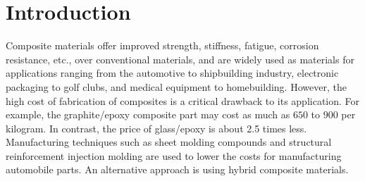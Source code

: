\section{Introduction}
Composite materials offer improved strength, stiffness, fatigue, corrosion resistance, etc., over
conventional materials, and are widely used as materials for applications ranging from the automotive to shipbuilding
industry, electronic packaging to golf clubs, and medical equipment to homebuilding. However, the high
cost of fabrication of composites is a critical drawback to its application. For example, the
graphite/epoxy composite part may cost as much as $650$ to $900$ per kilogram. In contrast, the price
of glass/epoxy is about 2.5 times less. Manufacturing techniques such as sheet molding compounds and
structural reinforcement injection molding are used to lower the costs for manufacturing automobile parts.
An alternative approach is using hybrid composite materials.


